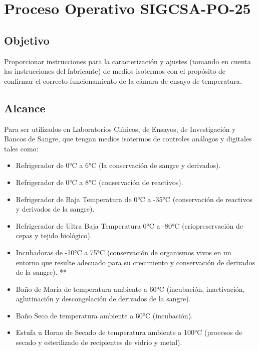 \section{Proceso Operativo SIGCSA-PO-25}

\subsection{Objetivo}
\par 
Proporcionar instrucciones para la caracterización y ajustes (tomando en cuenta las instrucciones
del fabricante) de medios isotermos con el propósito de confirmar el correcto funcionamiento de
la cámara de ensayo de temperatura\cite{po25}.

\subsection{Alcance}
\par 
Para ser utilizados en Laboratorios Clínicos, de Ensayos, de Investigación y Bancos de Sangre, que
tengan medios isotermos de controles análogos y digitales tales como\cite{po25}:

\begin{itemize}
	\item Refrigerador de 0°C a 6°C (la conservación de sangre y derivados).
	
	\item Refrigerador de 0°C a 8°C (conservación de reactivos).
	
	\item Refrigerador de Baja Temperatura de 0°C a -35°C (conservación de reactivos y derivados
	de la sangre).
	
	\item Refrigerador de Ultra Baja Temperatura 0°C a -80°C (criopreservación de cepas y tejido
	biológico).
	
	\clearpage
	\thispagestyle{plain}
	
	\item Incubadoras de -10°C a 75°C (conservación de organismos vivos en un entorno que
	resulte adecuado para su crecimiento y conservación de derivados de la sangre). **
	
	\item Baño de María de temperatura ambiente a 60°C (incubación, inactivación, aglutinación y
	descongelación de derivados de la sangre).
	
	\item Baño Seco de temperatura ambiente a 60°C (incubación).
	
	\item Estufa u Horno de Secado de temperatura ambiente a 100°C (procesos de secado y
	esterilizado de recipientes de vidrio y metal).
\end{itemize}

